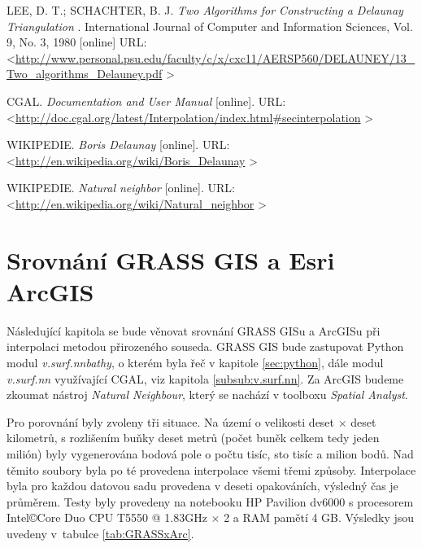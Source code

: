\documentclass[12pt,a4paper]{article}
\begin{document}
\begin{thebibliography}{99}
LEE, D. T.; SCHACHTER, B. J. \textit{Two Algorithms for Constructing a Delaunay Triangulation }. 
International Journal of Computer and Information Sciences, Vol. 9, No. 3, 1980 [online]
URL: \textless\url{http://www.personal.psu.edu/faculty/c/x/cxc11/AERSP560/DELAUNEY/13_Two_algorithms_Delauney.pdf}
\textgreater

CGAL. \textit{Documentation and User Manual} [online].
URL: \textless\url{http://doc.cgal.org/latest/Interpolation/index.html#secinterpolation}
\textgreater

WIKIPEDIE. \textit{Boris Delaunay} [online].
URL: \textless\url{http://en.wikipedia.org/wiki/Boris_Delaunay}
\textgreater

WIKIPEDIE. \textit{Natural neighbor} [online].
URL: \textless\url{http://en.wikipedia.org/wiki/Natural_neighbor}
\textgreater
\end{thebibliography}



\appendix
\newpage
\section{Srovnání GRASS GIS a Esri ArcGIS}
\label{app:srovnani}

Následující kapitola se bude věnovat srovnání GRASS GISu a ArcGISu při
interpolaci metodou přirozeného souseda. GRASS GIS bude zastupovat
Python modul \emph{v.surf.nnbathy}, o kterém byla řeč v 
kapitole \ref{sec:python}, dále modul \emph{v.surf.nn} využívající CGAL, viz kapitola \ref{subsub:v.surf.nn}. Za ArcGIS budeme zkoumat nástroj \emph{Natural Neighbour},
který se nachází v toolboxu \emph{Spatial Analyst}.

Pro porovnání byly zvoleny tři situace. Na území o velikosti deset
$\times$ deset kilometrů, s rozlišením buňky deset metrů (počet buněk celkem tedy jeden milión)
byly vygenerována
bodová pole o počtu tisíc, sto tisíc a milion bodů. Nad těmito soubory
byla po té provedena interpolace všemi třemi způsoby. Interpolace byla
pro každou datovou sadu provedena v deseti opakováních, výsledný čas
je průměrem. Testy byly provedeny na notebooku HP Pavilion dv6000 s
procesorem Intel\copyright Core Duo CPU T5550 @
1.83GHz $\times$ 2 a RAM pamětí 4 GB. Výsledky jsou uvedeny v~tabulce
\ref{tab:GRASSxArc}.
\end{document}
